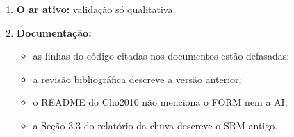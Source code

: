 \begin{enumerate}
\begin{itemize}
      \item o teste de Taylor com $\chi = S_e$.
    \end{itemize}
  \item \textbf{O ar ativo:} validação só qualitativa.
  \item \textbf{Documentação:}
    \begin{itemize}
      \item as linhas do código citadas nos documentos estão defasadas;
      \item a revisão bibliográfica descreve a versão anterior;
      \item o README do Cho2010 não menciona o FORM nem a AI;
      \item a Seção 3.3 do relatório da chuva descreve o SRM antigo.
    \end{itemize}
\end{enumerate}
